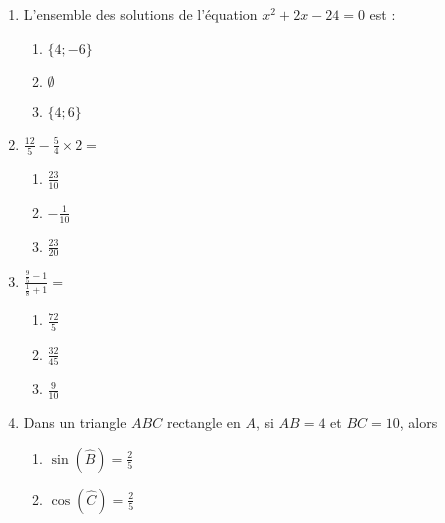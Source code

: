 \documentclass[oneside,twoside]{book}
\begin{document}
\begin{enumerate}
\item L'ensemble des solutions de l'équation $x^{2}+2 x-24=0$ est :

\begin{enumerate}

\item\BonneReponse $\{4 ;-6\}$

\item\MauvaiseReponse $\emptyset$


\item\MauvaiseReponse $\{4 ; 6\}$

\end{enumerate}



\item $\frac{12}{5} - \frac{5}{4} \times2=$

\begin{enumerate}

\item\MauvaiseReponse $\frac{23}{10}$

\item\BonneReponse $-\frac{1}{10}$

\item\MauvaiseReponse $\frac{23}{20}$


\end{enumerate}



\item $\displaystyle\frac{\frac{9}{5}-1}{\frac{1}{8}+1}=$

\begin{enumerate}


\item\MauvaiseReponse $\frac{72}{5}$

\item\BonneReponse $\frac{32}{45}$

\item\MauvaiseReponse $\frac{9}{10}$

\end{enumerate}



\item Dans un triangle $ABC$ rectangle en $A$, si $AB=4$ et $BC=10$, alors

\begin{enumerate}

\item\MauvaiseReponse $\sin (\hat{B})=\frac{2}{5}$


\item\MauvaiseReponse $\cos (\hat{C})=\frac{2}{5}$


\end{enumerate}
\end{enumerate}
\end{document}
